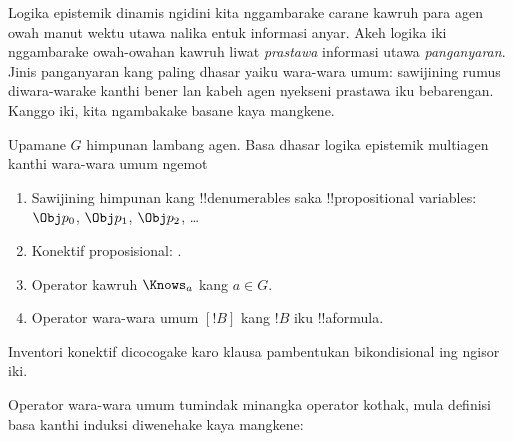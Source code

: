 \documentclass[../../../include/open-logic-section]{subfiles}
\begin{document}


Logika epistemik dinamis ngidini kita nggambarake carane kawruh para
agen owah manut wektu utawa nalika entuk informasi anyar. Akeh
logika iki nggambarake owah-owahan kawruh liwat \emph{prastawa}
informasi utawa \emph{panganyaran}. Jinis panganyaran kang paling
dhasar yaiku wara-wara umum: sawijining rumus diwara-warake kanthi
bener lan kabeh agen nyekseni prastawa iku bebarengan. Kanggo iki,
kita ngambakake basane kaya mangkene.

\begin{defn}
Upamane $G$ himpunan lambang agen. Basa dhasar logika epistemik
multiagen kanthi wara-wara umum ngemot
\begin{enumerate}
  \item Sawijining himpunan kang !!{denumerable}s saka !!{propositional variable}s: $\Obj
    p_0$, $\Obj p_1$, $\Obj p_2$, \dots
  \item Konektif proposisional: \startycommalist
  .
  \item Operator kawruh $\Knows_a$ kang $a \in G$.
  \item Operator wara-wara umum $[!B]$ kang $!B$ iku !!a{formula}.
\end{enumerate}
\end{defn}
Inventori konektif dicocogake karo klausa pambentukan bikondisional ing ngisor iki.

Operator wara-wara umum tumindak minangka operator kothak, mula
definisi basa kanthi induksi diwenehake kaya mangkene:
\end{document}
